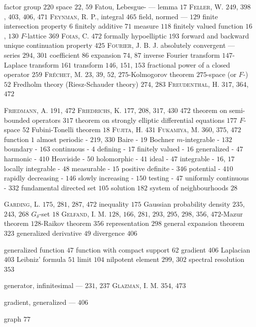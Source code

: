 factor group $220$ space $22$, $59$ Fatou, Lebesgue- --- lemma $17$ \textsc{Feller}, W. $249$, $398$, $403$, $406$, $471$ \textsc{Feynman}, R. P., integral $465$ field, normed --- $129$ finite intersection property $6$ finitely additive $71$ measure $118$ finitely valued function $16$, $130$ $F$-lattice $369$ \textsc{Foias}, C. $472$ formally hypoelliptic $193$ forward and backward unique continuation property $425$ \textsc{Fourier}, J. B. J. absolutely convergent --- series $294$, $301$ coefficient $86$ expansion $74$, $87$ inverse Fourier transform $147$-Laplace transform $161$ transform $146$, $151$, $153$ fractional power of a closed operator $259$ \textsc{Fréchet}, M. $23$, $39$, $52$, $275$-Kolmogorov theorem $275$-space (or $F$-) $52$ Fredholm theory (Riesz-Schauder theory) $274$, $283$ \textsc{Freudenthal}, H. $317$, $364$, $472$ 

\textsc{Friedmann}, A. $191$, $472$ \textsc{Friedrichs}, K. $177$, $208$, $317$, $430$ $472$ theorem on semi-bounded operators $317$ theorem on strongly elliptic differential equations $177$ $F$-space $52$ Fubini-Tonelli theorem $18$ \textsc{Fujita}, H. $431$ \textsc{Fukamiya}, M. $360$, $375$, $472$ function $1$ almost periodic - $219$, $330$ Baire - $19$ Bochner $m$-integrable - $132$ boundary - $163$ continuous - $4$ defining - $17$ finitely valued - $16$ generalized - $47$ harmonic - $410$ Heaviside - $50$ holomorphic - $41$ ideal - $47$ integrable - $16$, $17$ locally integrable - $48$ measurable - $15$ positive definite - $346$ potential - $410$ rapidly decreasing - $146$ slowly increasing - $150$ testing - $47$ uniformly continuous - $332$ fundamental directed set $105$ solution $182$ system of neighbourhoods $28$

\textsc{Garding}, L. $175$, $281$, $287$, $472$ inequality $175$ Gaussian probability density $235$, $243$, $268$ $G_{\delta}$-set $18$ \textsc{Gelfand}, I. M. $128$, $166$, $281$, $293$, $295$, $298$, $356$, $472$-Mazur theorem $128$-Raikov theorem $356$ representation $298$ general expansion theorem $323$ generalized derivative $49$ divergence $406$ 

generalized function $47$ function with compact support $62$ gradient $406$ Laplacian $403$ Leibniz' formula $51$ limit $104$ nilpotent element $299$, $302$ spectral resolution $353$

generator, infinitesimal --- $231$, $237$ \textsc{Glazman}, I. M. $354$, $473$

gradient, generalized --- $406$

graph $77$

